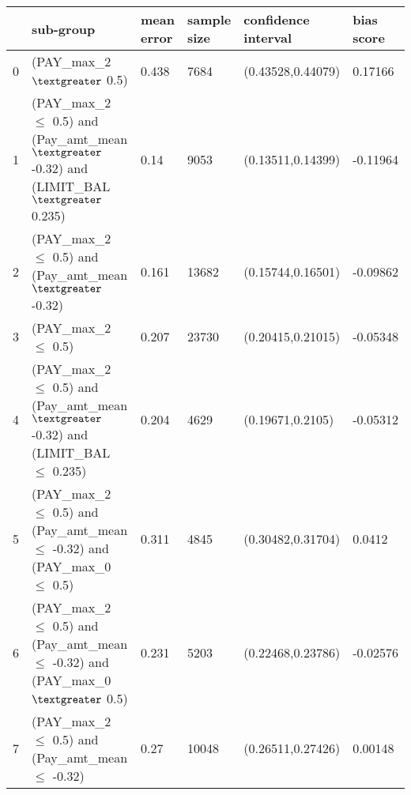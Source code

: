\begin{tabular}{llllll}
\toprule
{} &                                                               sub-group & mean error & sample size & confidence interval & bias score \\
\midrule
0 &                                                       (PAY\_max\_2 $\textgreater$ 0.5) &      0.438 &        7684 &   (0.43528,0.44079) &    0.17166 \\
1 &   (PAY\_max\_2 $\leq$ 0.5) and (Pay\_amt\_mean $\textgreater$ -0.32) and (LIMIT\_BAL $\textgreater$ 0.235) &       0.14 &        9053 &   (0.13511,0.14399) &   -0.11964 \\
2 &                           (PAY\_max\_2 $\leq$ 0.5) and (Pay\_amt\_mean $\textgreater$ -0.32) &      0.161 &       13682 &   (0.15744,0.16501) &   -0.09862 \\
3 &                                                      (PAY\_max\_2 $\leq$ 0.5) &      0.207 &       23730 &   (0.20415,0.21015) &   -0.05348 \\
4 &  (PAY\_max\_2 $\leq$ 0.5) and (Pay\_amt\_mean $\textgreater$ -0.32) and (LIMIT\_BAL $\leq$ 0.235) &      0.204 &        4629 &    (0.19671,0.2105) &   -0.05312 \\
5 &   (PAY\_max\_2 $\leq$ 0.5) and (Pay\_amt\_mean $\leq$ -0.32) and (PAY\_max\_0 $\leq$ 0.5) &      0.311 &        4845 &   (0.30482,0.31704) &     0.0412 \\
6 &    (PAY\_max\_2 $\leq$ 0.5) and (Pay\_amt\_mean $\leq$ -0.32) and (PAY\_max\_0 $\textgreater$ 0.5) &      0.231 &        5203 &   (0.22468,0.23786) &   -0.02576 \\
7 &                          (PAY\_max\_2 $\leq$ 0.5) and (Pay\_amt\_mean $\leq$ -0.32) &       0.27 &       10048 &   (0.26511,0.27426) &    0.00148 \\
\bottomrule
\end{tabular}
